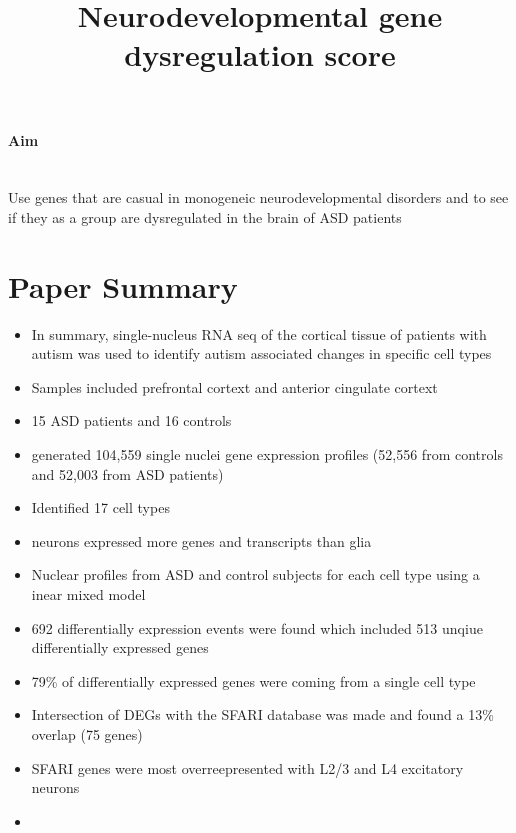 \documentclass[12pt]{article}
\title{Neurodevelopmental gene dysregulation score}
\begin{document}
\maketitle

\paragraph{Aim}
~\\ Use genes that are casual in monogeneic neurodevelopmental disorders and to see if they as a group are dysregulated in the brain of ASD patients

\section{Paper Summary}

\begin{itemize}
    \item In summary, single-nucleus RNA seq of the cortical tissue of patients with autism was used to identify autism associated changes in specific cell types 
    \item Samples included prefrontal cortext and anterior cingulate cortext 
    \item 15 ASD patients and 16 controls 
    \item generated 104,559 single nuclei gene expression profiles (52,556 from controls and 52,003 from ASD patients)
    \item Identified 17 cell types 
    \item neurons expressed more genes and transcripts than glia 
    \item Nuclear profiles from ASD and control subjects for each cell type using a inear mixed model 
    \item 692 differentially expression events were found which included 513 unqiue differentially expressed genes 
    \item 79\% of differentially expressed genes were coming from a single cell type
    \item Intersection of DEGs with the SFARI database was made and found a 13\% overlap (75 genes)
    \item SFARI genes were most overreepresented with L2/3 and L4 excitatory neurons 
    \item 
    
\end{itemize}
\end{document}
